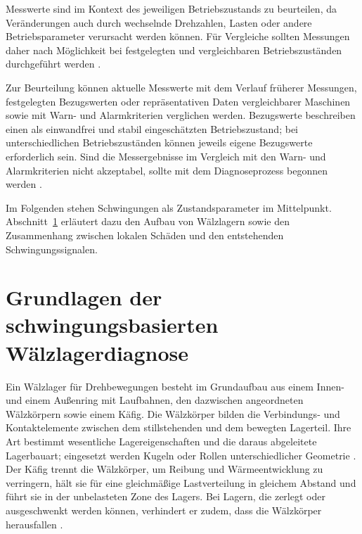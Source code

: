 Messwerte sind im Kontext des jeweiligen Betriebszustands zu beurteilen, da Veränderungen
auch durch wechselnde Drehzahlen, Lasten oder andere Betriebsparameter verursacht werden
können. Für Vergleiche sollten Messungen daher nach Möglichkeit bei festgelegten und
vergleichbaren Betriebszuständen durchgeführt werden
\cite[S.~14, Abschn.~8.4]{zotero-item-32}.

Zur Beurteilung können aktuelle Messwerte mit dem Verlauf früherer Messungen, festgelegten
Bezugswerten oder repräsentativen Daten vergleichbarer Maschinen sowie mit Warn- und
Alarmkriterien verglichen werden. Bezugswerte beschreiben einen als einwandfrei und stabil
eingeschätzten Betriebszustand; bei unterschiedlichen Betriebszuständen können jeweils eigene
Bezugswerte erforderlich sein. Sind die Messergebnisse im Vergleich mit den Warn- und
Alarmkriterien nicht akzeptabel, sollte mit dem Diagnoseprozess begonnen werden
\cite[S.~16, Abschn.~8.9--8.10; S.~17, Abschn.~9.1--9.3]{zotero-item-32}.

Im Folgenden stehen Schwingungen als Zustandsparameter im Mittelpunkt.
Abschnitt~\ref{sec:waelzlagerdiagnose} erläutert dazu den Aufbau von Wälzlagern
sowie den Zusammenhang zwischen lokalen Schäden und den entstehenden
Schwingungssignalen.

\section{Grundlagen der schwingungsbasierten Wälzlagerdiagnose}
\label{sec:waelzlagerdiagnose}

\label{par:aufbau_schadensarten_waelzlager}
Ein Wälzlager für Drehbewegungen besteht im Grundaufbau aus einem Innen- und
einem Außenring mit Laufbahnen, den dazwischen angeordneten Wälzkörpern sowie
einem Käfig. Die Wälzkörper
bilden die Verbindungs- und Kontaktelemente zwischen dem stillstehenden und dem
bewegten Lagerteil. Ihre Art bestimmt wesentliche Lagereigenschaften und die
daraus abgeleitete Lagerbauart; eingesetzt werden Kugeln oder Rollen
unterschiedlicher Geometrie
\cite[S.~650--651, Abb.~89 und Tabelle der Wälzkörperarten]
{schaefflerTechnicalPocketGuide2025}.
Der Käfig trennt die Wälzkörper, um Reibung und Wärmeentwicklung zu verringern,
hält sie für eine gleichmäßige Lastverteilung in gleichem Abstand und führt sie
in der unbelasteten Zone des Lagers. Bei Lagern, die zerlegt oder ausgeschwenkt
werden können, verhindert er zudem, dass die Wälzkörper herausfallen
\cite[S.~618, Abschnitt ``Cages'']{schaefflerTechnicalPocketGuide2025}.

